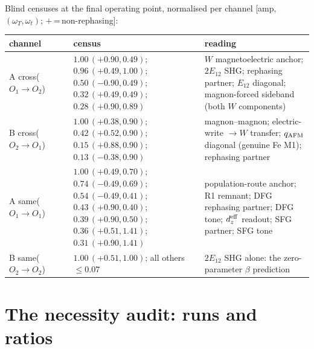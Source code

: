 \documentclass[11pt]{article}
\newcommand{\qafm}{q_{\rm AFM}}
\begin{document}
Blind censuses at the final operating point, normalised per channel
[amp, $(\omega_T,\omega_t)$; $+$\,=\,non-rephasing]:
\begin{center}\footnotesize
\renewcommand{\arraystretch}{1.2}
\begin{tabular}{p{1.7cm}p{6.6cm}p{5.2cm}}
\toprule
channel & census & reading\\
\midrule
A cross\newline ($O_1\!\to\!O_2$) &
  $1.00\,(+0.90,0.49)$; $0.96\,(+0.49,1.00)$;
  $0.50\,(-0.90,0.49)$; $0.32\,(+0.49,0.49)$;
  $0.28\,(+0.90,0.89)$ &
  $W$ magnetoelectric anchor; $2E_{12}$ SHG; rephasing partner;
  $E_{12}$ diagonal; magnon-forced sideband (both $W$ components)\\
B cross\newline ($O_2\!\to\!O_1$) &
  $1.00\,(+0.38,0.90)$; $0.42\,(+0.52,0.90)$;
  $0.15\,(+0.88,0.90)$; $0.13\,(-0.38,0.90)$ &
  magnon--magnon; electric-write $\to W$ transfer; $\qafm$ diagonal
  (genuine Fe M1); rephasing partner\\
A same\newline ($O_1\!\to\!O_1$) &
  $1.00\,(+0.49,0.70)$; $0.74\,(-0.49,0.69)$;
  $0.54\,(-0.49,0.41)$; $0.43\,(+0.90,0.40)$;
  $0.39\,(+0.90,0.50)$; $0.36\,(+0.51,1.41)$;
  $0.31\,(+0.90,1.41)$ &
  population-route anchor; R1 remnant; DFG rephasing partner; DFG
  tone; $d_z^{\rm eff}$ readout; SFG partner; SFG tone\\
B same\newline ($O_2\!\to\!O_2$) &
  $1.00\,(+0.51,1.00)$; all others $\leq0.07$ &
  $2E_{12}$ SHG alone: the zero-parameter $\beta$ prediction\\
\bottomrule
\end{tabular}
\end{center}

\section{The necessity audit: runs and ratios}
\label{si:audit}
\end{document}

